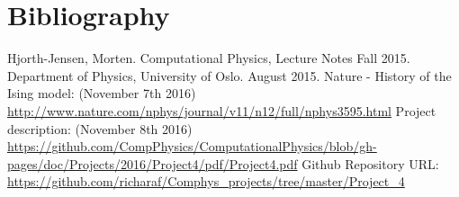 \documentclass[norsk,a4paper,12pt]{article}
\begin{document}
\section{Bibliography}
\begingroup
\renewcommand{\section}[2]{}
\begin{thebibliography}{}
  Hjorth-Jensen, Morten.
  Computational Physics, Lecture Notes Fall 2015.
  Department of Physics, University of Oslo.
  August 2015.
  Nature - History of the Ising model: 		(November 7th 2016)\newline
  \url{http://www.nature.com/nphys/journal/v11/n12/full/nphys3595.html}
  Project description:  (November 8th 2016)\newline
  \url{https://github.com/CompPhysics/ComputationalPhysics/blob/gh-    pages/doc/Projects/2016/Project4/pdf/Project4.pdf}
  Github Repository URL:
  \url{https://github.com/richaraf/Comphys_projects/tree/master/Project_4}
\end{thebibliography}
\endgroup
\end{document}

